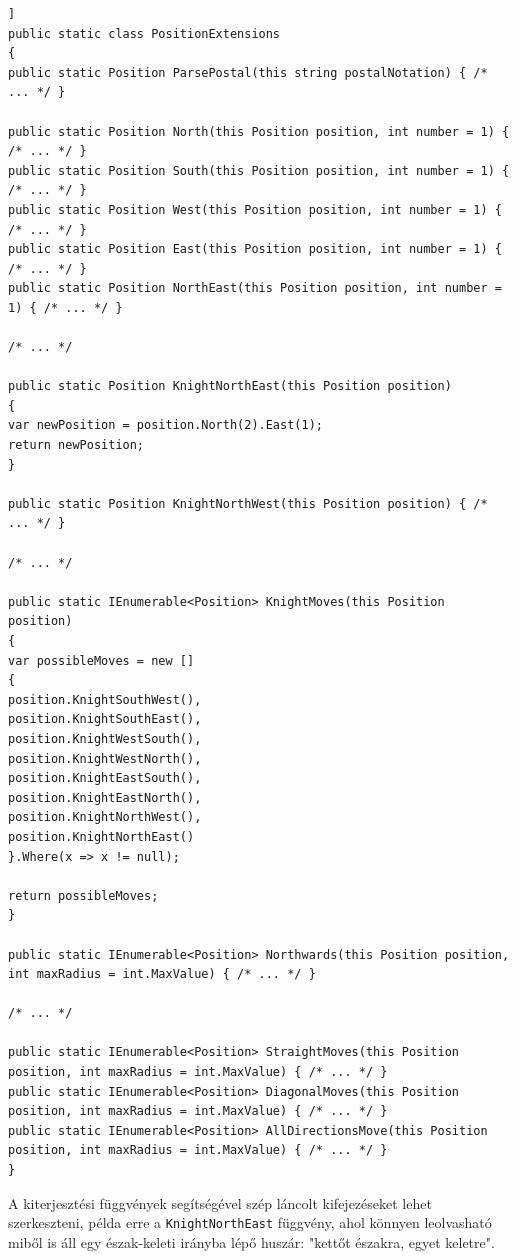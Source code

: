 \documentclass[twoside, a4paper, 12pt]{book}
\begin{document}
\begin{lstlisting}[caption=Pozíciók segédfüggvényes - PositionExtensions osztály, label=lst:chessboardpositionextensions_code, float,floatplacement=H]]
public static class PositionExtensions
{
public static Position ParsePostal(this string postalNotation) { /* ... */ }

public static Position North(this Position position, int number = 1) { /* ... */ }
public static Position South(this Position position, int number = 1) { /* ... */ }
public static Position West(this Position position, int number = 1) { /* ... */ }
public static Position East(this Position position, int number = 1) { /* ... */ }
public static Position NorthEast(this Position position, int number = 1) { /* ... */ }

/* ... */

public static Position KnightNorthEast(this Position position)
{
var newPosition = position.North(2).East(1);
return newPosition;
}

public static Position KnightNorthWest(this Position position) { /* ... */ }

/* ... */

public static IEnumerable<Position> KnightMoves(this Position position)
{
var possibleMoves = new []
{
position.KnightSouthWest(),
position.KnightSouthEast(),
position.KnightWestSouth(),
position.KnightWestNorth(),
position.KnightEastSouth(),
position.KnightEastNorth(),
position.KnightNorthWest(),
position.KnightNorthEast()
}.Where(x => x != null);

return possibleMoves;
}

public static IEnumerable<Position> Northwards(this Position position, int maxRadius = int.MaxValue) { /* ... */ }

/* ... */

public static IEnumerable<Position> StraightMoves(this Position position, int maxRadius = int.MaxValue) { /* ... */ }
public static IEnumerable<Position> DiagonalMoves(this Position position, int maxRadius = int.MaxValue) { /* ... */ }
public static IEnumerable<Position> AllDirectionsMove(this Position position, int maxRadius = int.MaxValue) { /* ... */ }
}

\end{lstlisting}

A kiterjesztési függvények segítségével szép láncolt kifejezéseket lehet szerkeszteni, példa erre a \texttt{KnightNorthEast} függvény, ahol könnyen leolvasható miből is áll egy észak-keleti irányba lépő huszár: "kettőt északra, egyet keletre".
\end{document}
